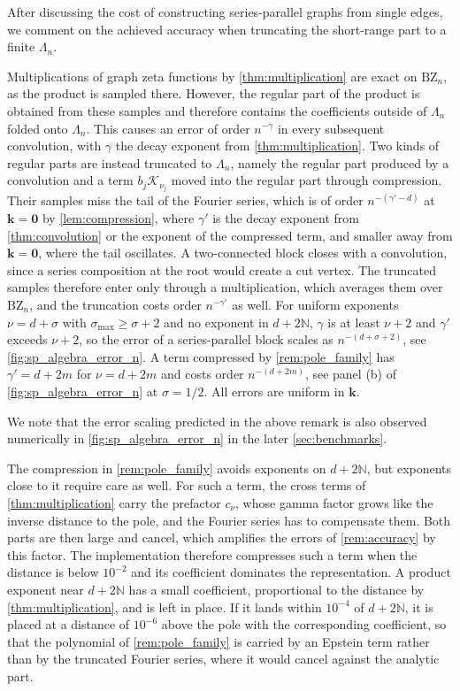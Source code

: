 \documentclass[]{amsart}
\numberwithin{mythm}{section}
\begin{document}
After discussing the cost of constructing series-parallel graphs from single edges, we comment on the achieved accuracy when truncating the short-range part to a finite $\Lambda_n$.

\begin{remark}[Accuracy]
    \label{rem:accuracy}
Multiplications of graph zeta functions by \cref{thm:multiplication} are exact on $\mathrm{BZ}_n$, as the product is sampled there. However, the regular part of the product is obtained from these samples and therefore contains the coefficients outside of $\Lambda_n$ folded onto $\Lambda_n$. This causes an error of order $n^{-\gamma}$ in every subsequent convolution, with $\gamma$ the decay exponent from \cref{thm:multiplication}. Two kinds of regular parts are instead truncated to $\Lambda_n$, namely the regular part produced by a convolution and a term $b_j\mathcal K_{\nu_j}$ moved into the regular part through compression. Their samples miss the tail of the Fourier series, which is of order $n^{-(\gamma'-d)}$ at $\bm k=\bm 0$ by \cref{lem:compression}, where $\gamma'$ is the decay exponent from \cref{thm:convolution} or the exponent of the compressed term, and smaller away from $\bm k=\bm 0$, where the tail oscillates. A two-connected block closes with a convolution, since a series composition at the root would create a cut vertex. The truncated samples therefore enter only through a multiplication, which averages them over $\mathrm{BZ}_n$, and the truncation costs order $n^{-\gamma'}$ as well. For uniform exponents $\nu=d+\sigma$ with $\sigma_{\mathrm{max}}\ge\sigma+2$ and no exponent in $d+2\mathds N$, $\gamma$ is at least $\nu+2$ and $\gamma'$ exceeds $\nu+2$, so the error of a series-parallel block scales as $n^{-(d+\sigma+2)}$, see \cref{fig:sp_algebra_error_n}. A term compressed by \cref{rem:pole_family} has $\gamma'=d+2m$ for $\nu=d+2m$ and costs order $n^{-(d+2m)}$, see panel (b) of \cref{fig:sp_algebra_error_n} at $\sigma=1/2$. All errors are uniform in $\bm k$.
\end{remark}

We note that the error scaling predicted in the above remark is also observed numerically in \cref{fig:sp_algebra_error_n} in the later \cref{sec:benchmarks}.

The compression in \cref{rem:pole_family} avoids exponents on $d+2\mathds N$, but exponents close to it require care as well. For such a term, the cross terms of \cref{thm:multiplication} carry the prefactor $c_\nu$, whose gamma factor grows like the inverse distance to the pole, and the Fourier series has to compensate them. Both parts are then large and cancel, which amplifies the errors of \cref{rem:accuracy} by this factor. The implementation therefore compresses such a term when the distance is below $10^{-2}$ and its coefficient dominates the representation. A product exponent near $d+2\mathds N$ has a small coefficient, proportional to the distance by \cref{thm:multiplication}, and is left in place. If it lands within $10^{-4}$ of $d+2\mathds N$, it is placed at a distance of $10^{-6}$ above the pole with the corresponding coefficient, so that the polynomial of \cref{rem:pole_family} is carried by an Epstein term rather than by the truncated Fourier series, where it would cancel against the analytic part.
\end{document}
